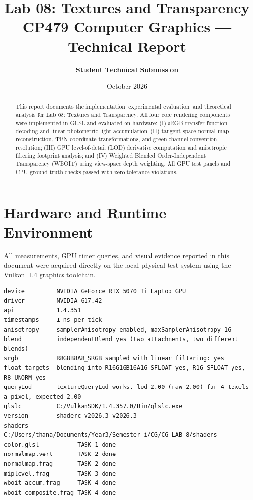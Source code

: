 \documentclass[10pt,a4paper]{article}
\title{\Large\textbf{Lab 08: Textures and Transparency}\\[0.3em]
\large CP479 Computer Graphics --- Technical Report}
\author{\textbf{Student Technical Submission}}
\date{October 2026}
\begin{document}
\maketitle
\thispagestyle{fancy}

\begin{abstract}
This report documents the implementation, experimental evaluation, and theoretical analysis for Lab 08: Textures and Transparency. All four core rendering components were implemented in GLSL and evaluated on hardware: (I) sRGB transfer function decoding and linear photometric light accumulation; (II) tangent-space normal map reconstruction, TBN coordinate transformations, and green-channel convention resolution; (III) GPU level-of-detail (LOD) derivative computation and anisotropic filtering footprint analysis; and (IV) Weighted Blended Order-Independent Transparency (WBOIT) using view-space depth weighting. All GPU test panels and CPU ground-truth checks passed with zero tolerance violations.
\end{abstract}

\section{Hardware and Runtime Environment}

All measurements, GPU timer queries, and visual evidence reported in this document were acquired directly on the local physical test system using the Vulkan~1.4 graphics toolchain.

\begin{lstlisting}[caption={Runtime Environment and Device Capability Panel Output (make info)}]
device         NVIDIA GeForce RTX 5070 Ti Laptop GPU
driver         NVIDIA 617.42
api            1.4.351
timestamps     1 ns per tick
anisotropy     samplerAnisotropy enabled, maxSamplerAnisotropy 16
blend          independentBlend yes (two attachments, two different blends)
srgb           R8G8B8A8_SRGB sampled with linear filtering: yes
float targets  blending into R16G16B16A16_SFLOAT yes, R16_SFLOAT yes, R8_UNORM yes
queryLod       textureQueryLod works: lod 2.00 (raw 2.00) for 4 texels a pixel, expected 2.00
glslc          C:/VulkanSDK/1.4.357.0/Bin/glslc.exe
version        shaderc v2026.3 v2026.3
shaders        C:/Users/thana/Documents/Year3/Semester_i/CG/CG_LAB_8/shaders
color.glsl           TASK 1 done
normalmap.vert       TASK 2 done
normalmap.frag       TASK 2 done
miplevel.frag        TASK 3 done
wboit_accum.frag     TASK 4 done
wboit_composite.frag TASK 4 done
\end{lstlisting}
\end{document}
